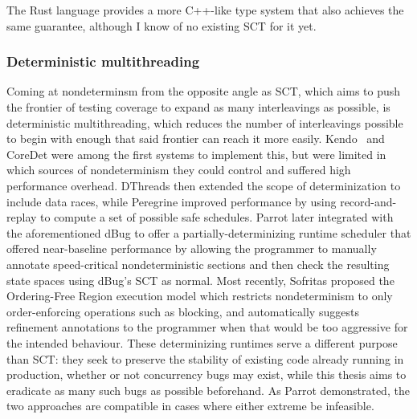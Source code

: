 The Rust language \cite{rust-language}
provides a more C++-like type system that also
achieves the same guarantee, although I know of no existing SCT for it yet.


\subsubsection{Deterministic multithreading}

Coming at nondeterminsm from the opposite angle as SCT,
which aims to push the frontier of testing coverage to expand as many interleavings as possible,
is deterministic multithreading,
which reduces the number of interleavings possible to begin with enough that said frontier can reach it more easily.
Kendo~\cite{kendo} and CoreDet \cite{coredet} were among the first systems to implement this,
but were limited in which sources of nondeterminism they could control
and suffered high performance overhead.
DThreads \cite{dthreads} then extended the scope of determinization to include data races,
while Peregrine \cite{peregrine}
improved performance by using record-and-replay to compute a set of possible safe schedules.
%
Parrot \cite{parrot} later integrated with the aforementioned dBug \cite{dbug-ssv}
to offer a partially-determinizing runtime scheduler
that offered near-baseline performance by allowing the programmer to
manually annotate speed-critical nondeterministic sections
and then check the resulting state spaces using dBug's SCT as normal.
%
Most recently, Sofritas \cite{sofritas}
proposed the Ordering-Free Region execution model
which restricts nondeterminism to only order-enforcing operations such as blocking,
and automatically suggests refinement annotations to the programmer
when that would be too aggressive for the intended behaviour.
These determinizing runtimes serve a different purpose than SCT:
they seek to preserve the stability of existing code already running in production,
whether or not concurrency bugs may exist,
while this thesis aims to eradicate as many such bugs as possible beforehand.
As Parrot demonstrated, the two approaches are compatible in cases where either extreme be infeasible.

